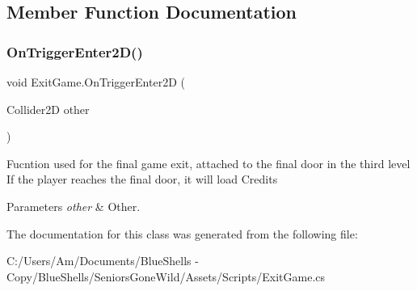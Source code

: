 \subsection{Member Function Documentation}
\mbox{\label{class_exit_game_a8f08c761927046e6e12aad0e76907609}} 
\subsubsection{\texorpdfstring{On\+Trigger\+Enter2\+D()}{OnTriggerEnter2D()}}
{\footnotesize\ttfamily void Exit\+Game.\+On\+Trigger\+Enter2D (\begin{DoxyParamCaption}\item[{Collider2D}]{other }\end{DoxyParamCaption})\hspace{0.3cm}{\ttfamily [private]}}



Fucntion used for the final game exit, attached to the final door in the third level If the player reaches the final door, it will load Credits 


\begin{DoxyParams}{Parameters}
{\em other} & Other.\\
\hline
\end{DoxyParams}


The documentation for this class was generated from the following file\+:\begin{DoxyCompactItemize}
\item 
C\+:/\+Users/\+Am/\+Documents/\+Blue\+Shells -\/ Copy/\+Blue\+Shells/\+Seniors\+Gone\+Wild/\+Assets/\+Scripts/Exit\+Game.\+cs\end{DoxyCompactItemize}
